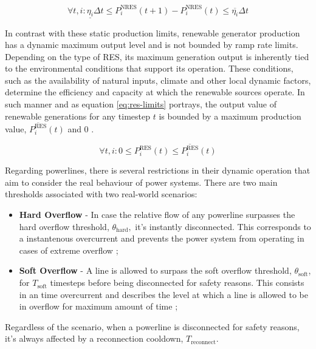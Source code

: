 \begin{equation} \label{eq:ramp-limits}
	\forall t, i: \underline{\eta_i } \Delta t \leq P^\text{NRES}_i (t + 1) - P^\text{NRES}_i (t) \leq \overline{\eta_i} \Delta t
\end{equation}

In contrast with these static production limits, renewable generator production has a dynamic maximum output level and is not bounded by ramp rate limits. Depending on the type of \ac{RES}, its maximum generation output is inherently tied to the environmental conditions that support its operation. These conditions, such as the availability of natural inputs, climate and other local dynamic factors, determine the efficiency and capacity at which the renewable sources operate. In such manner and as equation \ref{eq:res-limits} portrays, the output value of renewable generations for any timestep $t$ is bounded by a maximum production value, $\overline{P^\text{RES}_i} (t)$ and 0 \cite{chenScalableGraphReinforcement2023, liNovelGraphReinforcement2022}.

\begin{equation} \label{eq:res-limits}
	\forall t, i: 0 \leq P^\text{RES}_i (t) \leq \overline{P^\text{RES}_i} (t)
\end{equation}

Regarding powerlines, there is several restrictions in their dynamic operation that aim to consider the real behaviour of power systems. There are two main thresholds associated with two real-world scenarios:

\begin{itemize}
	\item \textbf{Hard Overflow} - In case the relative flow of any powerline surpasses the hard overflow threshold, $\theta_\text{hard},$ it's instantly disconnected. This corresponds to a instantenous overcurrent and prevents the power system from operating in cases of extreme overflow \cite{rtefranceGrid2OpDocumentation};
	\item \textbf{Soft Overflow} - A line is allowed to surpass the soft overflow threshold, $\theta_\text{soft}$, for $T_\text{soft}$ timesteps before being disconnected for safety reasons. This consists in an time overcurrent and describes the level at which a line is allowed to be in overflow for maximum amount of time \cite{rtefranceGrid2OpDocumentation};
\end{itemize}
Regardless of the scenario, when a powerline is disconnected for safety reasons, it's always affected by a reconnection cooldown, $T_\text{reconnect}$.

